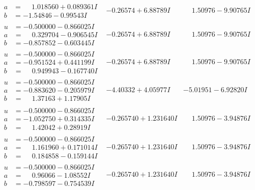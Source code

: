 \documentclass[1p]{elsarticle_modified}
\theoremstyle{definition}
\begin{document}
$$\begin{array}{c|c|c}
\begin{aligned}
a &= \phantom{-}1.018560 + 0.089361 I \\
b &= -1.54846 - 0.99543 I\end{aligned}
 & -0.26574 + 6.88789 I & \phantom{-}1.50976 - 9.90765 I \\ \hline\begin{aligned}
u &= -0.500000 - 0.866025 I \\
a &= \phantom{-}0.329704 - 0.906545 I \\
b &= -0.857852 - 0.603445 I\end{aligned}
 & -0.26574 + 6.88789 I & \phantom{-}1.50976 - 9.90765 I \\ \hline\begin{aligned}
u &= -0.500000 - 0.866025 I \\
a &= -0.951524 + 0.441199 I \\
b &= \phantom{-}0.949943 - 0.167740 I\end{aligned}
 & -0.26574 + 6.88789 I & \phantom{-}1.50976 - 9.90765 I \\ \hline\begin{aligned}
u &= -0.500000 - 0.866025 I \\
a &= -0.883620 - 0.205979 I \\
b &= \phantom{-}1.37163 + 1.17905 I\end{aligned}
 & -4.40332 + 4.05977 I & -5.01951 - 6.92820 I \\ \hline\begin{aligned}
u &= -0.500000 - 0.866025 I \\
a &= -1.052750 + 0.314335 I \\
b &= \phantom{-}1.42042 + 0.28919 I\end{aligned}
 & -0.265740 + 1.231640 I & \phantom{-}1.50976 - 3.94876 I \\ \hline\begin{aligned}
u &= -0.500000 - 0.866025 I \\
a &= \phantom{-}1.161960 + 0.171014 I \\
b &= \phantom{-}0.184858 - 0.159144 I\end{aligned}
 & -0.265740 + 1.231640 I & \phantom{-}1.50976 - 3.94876 I \\ \hline\begin{aligned}
u &= -0.500000 - 0.866025 I \\
a &= \phantom{-}0.96066 - 1.08552 I \\
b &= -0.798597 - 0.754539 I\end{aligned}
 & -0.265740 + 1.231640 I & \phantom{-}1.50976 - 3.94876 I \\ \hline\begin{aligned}

\end{aligned}
\end{array}$$
\end{document}
